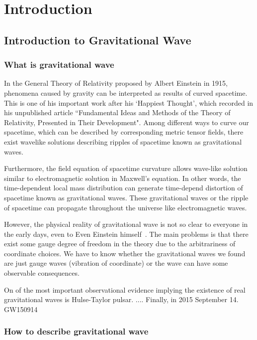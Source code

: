 \chapter{Introduction} 
\section{Introduction to Gravitational Wave}
\subsection{What is gravitational wave}

In the General Theory of Relativity proposed by Albert Einstein in 1915, phenomena caused by gravity can be interpreted as results of curved spacetime. This is one of his important work after his `Happiest Thought', which recorded in his unpublished article ``Fundamental Ideas and Methods of the Theory of Relativity, Presented in Their Development"\cite{Einstein:happy}. Among different ways to curve our spacetime, which can be described by corresponding metric tensor fields, there exist wavelike solutions describing ripples of spacetime known as gravitational waves.




Furthermore, the field equation of spacetime curvature allows wave-like solution similar to electromagnetic solution in Maxwell’s equation. In other words, the time-dependent local mass distribution can generate time-depend distortion of spacetime known as gravitational waves. These gravitational waves or the ripple of spacetime can propagate throughout the universe like electromagnetic waves.
	
However, the physical reality of gravitational wave is not so clear to everyone in the early days, even to Even Einstein himself~\cite{Einstein:ongw}. The main problems is that there exist some gauge degree of freedom in the theory due to the arbitrariness of coordinate choices. We have to know whether the gravitational waves we found are just gauge waves (vibration of coordinate) or the wave can have some observable consequences. 

On of the most important observational evidence implying the existence of real gravitational waves is Hulse-Taylor pulsar.  
....
Finally, in 2015 September 14.
GW150914

\subsection{How to describe gravitational wave}

